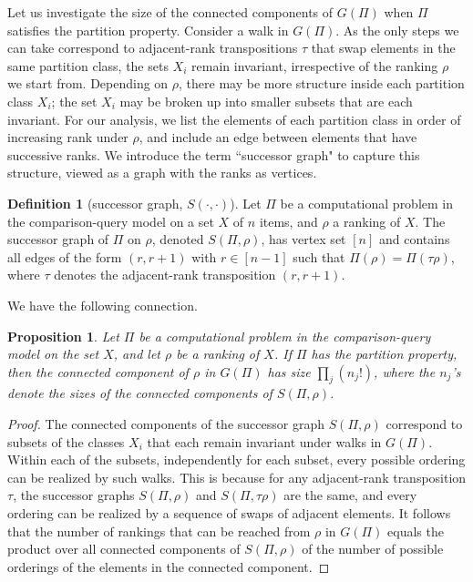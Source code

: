 \documentclass[11pt]{article}
\numberwithin{equation}{section}
\newtheorem{proposition}[theorem]{Proposition}
\theoremstyle{definition}
\newtheorem{definition}[theorem]{Definition}
\theoremstyle{plain}
\newcommand{\ranking}{\rho}
\newcommand{\transposition}{\tau}
\begin{document}
Let us investigate the size of the connected components of $G(\Pi)$ when $\Pi$ satisfies the partition property. Consider a walk in $G(\Pi)$. As the only steps we can take correspond to adjacent-rank transpositions $\transposition$ that swap elements in the same partition class, the sets $X_i$ remain invariant, irrespective of the ranking $\ranking$ we start from. Depending on $\ranking$, there may be more structure inside each partition class $X_i$; the set $X_i$ may be broken up into smaller subsets that are each invariant. For our analysis, we list the elements of each partition class in order of increasing rank under $\ranking$, and include an edge between elements that have successive ranks. We introduce the term ``successor graph" to capture this structure, viewed as a graph with the ranks as vertices.
\begin{definition}[successor graph, $S(\cdot,\cdot)$]
Let $\Pi$ be a computational problem in the comparison-query model on a set $X$ of $n$ items, and $\ranking$ a ranking of $X$. The successor graph of $\Pi$ on $\ranking$, denoted $S(\Pi,\ranking)$, has vertex set $[n]$ and contains all edges of the form $(r,r+1)$ with $r \in [n-1]$ such that $\Pi(\ranking) = \Pi(\transposition \ranking)$, where $\transposition$ denotes the adjacent-rank transposition $(r,r+1)$.
\end{definition}

We have the following connection.
\begin{proposition}\label{prop:successor:components}
Let $\Pi$ be a computational problem in the comparison-query model on the set $X$, and let $\ranking$ be a ranking of $X$. If $\Pi$ has the partition property, then the connected component of $\ranking$ in $G(\Pi)$ has size $\prod_j (n_j!)$, where the $n_j$'s denote the sizes of the connected components of $S(\Pi,\ranking)$.
\end{proposition}
\begin{proof}
The connected components of the successor graph $S(\Pi,\ranking)$ correspond to subsets of the classes $X_i$ that each remain invariant under walks in $G(\Pi)$. Within each of the subsets, independently for each subset, every possible ordering can be realized by such walks. This is because for any adjacent-rank transposition $\transposition$, the successor graphs $S(\Pi,\ranking)$ and $S(\Pi,\transposition \ranking)$ are the same, and every ordering can be realized by a sequence of swaps of adjacent elements. It follows that the number of rankings that can be reached from $\ranking$ in $G(\Pi)$ equals the product over all connected components of $S(\Pi,\ranking)$ of the number of possible orderings of the elements in the connected component. 
\end{proof}
\end{document}
